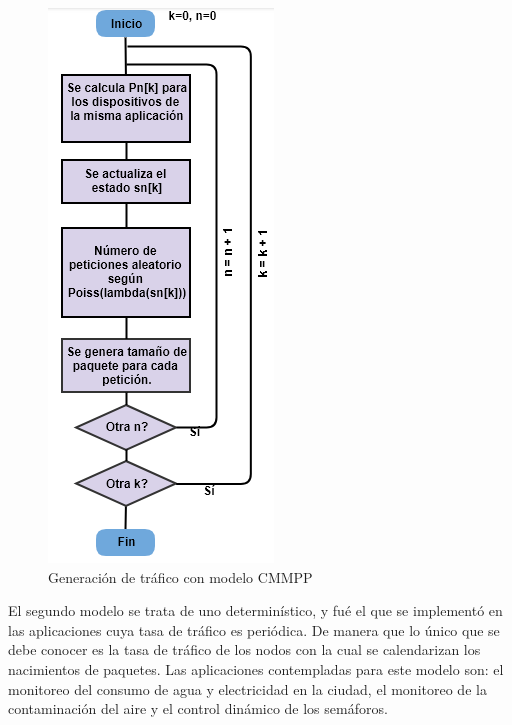 \begin{figure}[th]
\centering
\includegraphics[scale=.7]{Figures/Generación de tráfico con modelo CMMPP}
\decoRule
\caption[Generación de tráfico con modelo CMMPP]{Generación de tráfico con modelo CMMPP}
\label{fig:CMMPP_Algoritmo}
\end{figure}

El segundo modelo se trata de uno determinístico, y fué el que se implementó en las aplicaciones cuya tasa de tráfico es periódica. De manera que lo único que se debe conocer es la tasa de tráfico de los nodos con la cual se calendarizan los nacimientos de paquetes. Las aplicaciones contempladas para este modelo son: el monitoreo del consumo de agua y electricidad en la ciudad, el monitoreo de la contaminación del aire y el control dinámico de los semáforos.\newline

